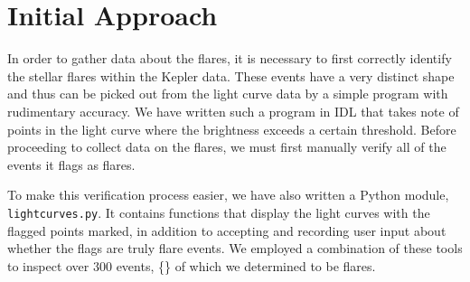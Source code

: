 \documentclass[11pt]{article}
\begin{document}



\section{Initial Approach}
\label{sec:initial}
In order to gather data about the flares, it is necessary to first
correctly identify the stellar flares within the Kepler data.  These
events have a very distinct shape and thus can be picked out from the
light curve data by a simple program with rudimentary accuracy.  We
have written such a program in IDL that takes note of points in the
light curve where the brightness exceeds a certain threshold.  Before
proceeding to collect data on the flares, we must first manually
verify all of the events it flags as flares.

To make this verification process easier, we have also written a
Python module, \verb|lightcurves.py|.  It contains functions that
display the light curves with the flagged points marked, in addition
to accepting and recording user input about whether the flags are
truly flare events.  We employed a combination of these tools to
inspect over 300 events, \{\} of which we determined to be flares.


\end{document}
